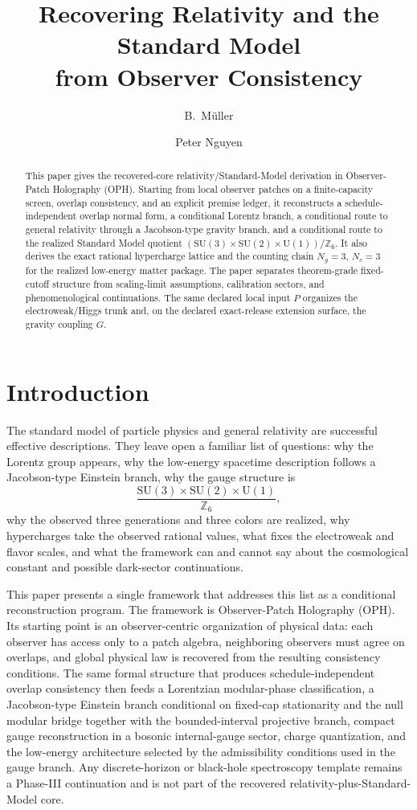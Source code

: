 \documentclass[11pt]{article}
\title{Recovering Relativity and the Standard Model\\
from Observer Consistency}
\author{B.\ M\"uller \and Peter Nguyen}
\date{\OPHPaperReleaseDate}
\newcommand{\SU}{\mathrm{SU}}
\newcommand{\U}{\mathrm{U}}
\begin{document}
\maketitle
\OPHPaperReleaseBanner

\begin{abstract}
This paper gives the recovered-core relativity/Standard-Model derivation in Observer-Patch Holography (OPH). Starting from local observer patches on a finite-capacity screen, overlap consistency, and an explicit premise ledger, it reconstructs a schedule-independent overlap normal form, a conditional Lorentz branch, a conditional route to general relativity through a Jacobson-type gravity branch, and a conditional route to the realized Standard Model quotient \(\left(\SU(3)\times\SU(2)\times\U(1)\right)/\mathbb Z_6\). It also derives the exact rational hypercharge lattice and the counting chain \(N_g=3\), \(N_c=3\) for the realized low-energy matter package. The paper separates theorem-grade fixed-cutoff structure from scaling-limit assumptions, calibration sectors, and phenomenological continuations. The same declared local input \(P\) organizes the electroweak/Higgs trunk and, on the declared exact-release extension surface, the gravity coupling \(G\).
\end{abstract}

\section{Introduction}

The standard model of particle physics and general relativity are successful effective descriptions. They leave open a familiar list of questions: why the Lorentz group appears, why the low-energy spacetime description follows a Jacobson-type Einstein branch, why the gauge structure is
\[
\frac{\SU(3)\times\SU(2)\times\U(1)}{\mathbb Z_6},
\]
why the observed three generations and three colors are realized, why hypercharges take the observed rational values, what fixes the electroweak and flavor scales, and what the framework can and cannot say about the cosmological constant and possible dark-sector continuations.

This paper presents a single framework that addresses this list as a conditional reconstruction program. The framework is Observer-Patch Holography (OPH). Its starting point is an observer-centric organization of physical data: each observer has access only to a patch algebra, neighboring observers must agree on overlaps, and global physical law is recovered from the resulting consistency conditions. The same formal structure that produces schedule-independent overlap consistency then feeds a Lorentzian modular-phase classification, a Jacobson-type Einstein branch conditional on fixed-cap stationarity and the null modular bridge together with the bounded-interval projective branch, compact gauge reconstruction in a bosonic internal-gauge sector, charge quantization, and the low-energy architecture selected by the admissibility conditions used in the gauge branch. Any discrete-horizon or black-hole spectroscopy template remains a Phase-III continuation and is not part of the recovered relativity-plus-Standard-Model core.
\end{document}
